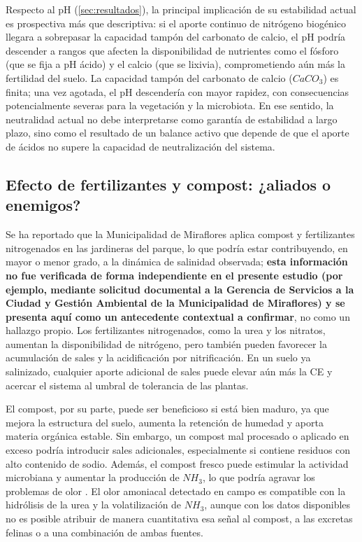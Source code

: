 \documentclass[fleqn]{jaes}
\begin{document}
Respecto al pH (\cref{sec:resultados}), la principal implicación de su estabilidad actual es prospectiva más que descriptiva: si el aporte continuo de nitrógeno biogénico llegara a sobrepasar la capacidad tampón del carbonato de calcio, el pH podría descender a rangos que afecten la disponibilidad de nutrientes como el fósforo (que se fija a pH ácido) y el calcio (que se lixivia), comprometiendo aún más la fertilidad del suelo. La capacidad tampón del carbonato de calcio ($CaCO_3$) es finita; una vez agotada, el pH descendería con mayor rapidez, con consecuencias potencialmente severas para la vegetación y la microbiota. En ese sentido, la neutralidad actual no debe interpretarse como garantía de estabilidad a largo plazo, sino como el resultado de un balance activo que depende de que el aporte de ácidos no supere la capacidad de neutralización del sistema.

\subsection{Efecto de fertilizantes y compost: ¿aliados o enemigos?}

Se ha reportado que la Municipalidad de Miraflores aplica compost y fertilizantes nitrogenados en las jardineras del parque, lo que podría estar contribuyendo, en mayor o menor grado, a la dinámica de salinidad observada; \textbf{esta información no fue verificada de forma independiente en el presente estudio (por ejemplo, mediante solicitud documental a la Gerencia de Servicios a la Ciudad y Gestión Ambiental de la Municipalidad de Miraflores) y se presenta aquí como un antecedente contextual a confirmar}, no como un hallazgo propio. Los fertilizantes nitrogenados, como la urea y los nitratos, aumentan la disponibilidad de nitrógeno, pero también pueden favorecer la acumulación de sales y la acidificación por nitrificación. En un suelo ya salinizado, cualquier aporte adicional de sales puede elevar aún más la CE y acercar el sistema al umbral de tolerancia de las plantas.

El compost, por su parte, puede ser beneficioso si está bien maduro, ya que mejora la estructura del suelo, aumenta la retención de humedad y aporta materia orgánica estable. Sin embargo, un compost mal procesado o aplicado en exceso podría introducir sales adicionales, especialmente si contiene residuos con alto contenido de sodio. Además, el compost fresco puede estimular la actividad microbiana y aumentar la producción de $NH_3$, lo que podría agravar los problemas de olor \cite{Jiang2018}. El olor amoniacal detectado en campo es compatible con la hidrólisis de la urea y la volatilización de $NH_3$, aunque con los datos disponibles no es posible atribuir de manera cuantitativa esa señal al compost, a las excretas felinas o a una combinación de ambas fuentes.
\end{document}
